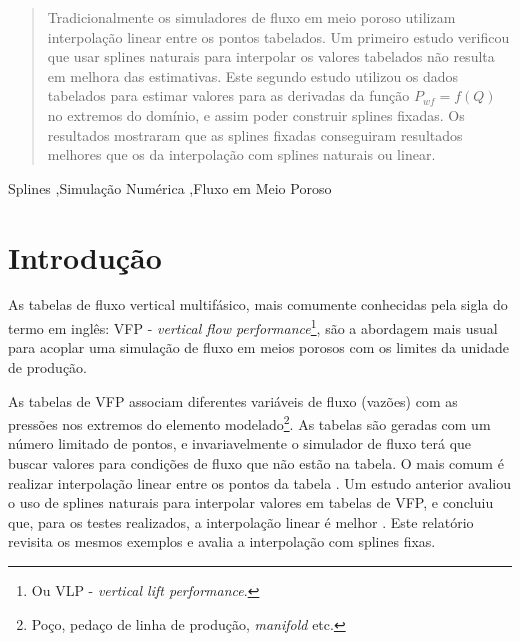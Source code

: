 \documentclass[final,5p]{elsarticle}
\numberwithin{equation}{section}
\begin{document}
\begin{frontmatter}
\begin{abstract}
    Tradicionalmente os simuladores de fluxo em meio poroso utilizam interpolação linear entre os pontos tabelados. Um primeiro estudo verificou que usar splines naturais para interpolar os valores tabelados não resulta em melhora das estimativas. Este segundo estudo utilizou os dados tabelados para estimar valores para as derivadas da função $P_{wf}=f(Q)$ no extremos do domínio, e assim poder construir splines fixadas. Os resultados mostraram que as splines fixadas conseguiram resultados melhores que os da interpolação com splines naturais ou linear.
    
\end{abstract}




\begin{keyword}
    Splines \sep Simulação Numérica \sep Fluxo em Meio Poroso



\end{keyword}

\end{frontmatter}


\section{Introdução}

    As tabelas de fluxo vertical multifásico, mais comumente conhecidas pela sigla do termo em inglês: VFP - \emph{vertical flow performance}\footnote{Ou VLP - \emph{vertical lift performance}.}, são a abordagem mais usual para acoplar uma simulação de fluxo em meios porosos com os limites da unidade de produção.

    As tabelas de VFP associam diferentes variáveis de fluxo (vazões) com as pressões nos extremos do elemento modelado\footnote{Poço, pedaço de linha de produção, \emph{manifold} etc.}. As tabelas são geradas com um número limitado de pontos, e invariavelmente o simulador de fluxo terá que buscar valores para condições de fluxo que não estão na tabela. O mais comum é realizar interpolação linear entre os pontos da tabela \cite{computer2022cmg}\cite{schlumberger2009technical}. Um estudo anterior avaliou o uso de splines naturais para interpolar valores em tabelas de VFP, e concluiu que, para os testes realizados, a interpolação linear é melhor \cite{relatoriosplinesnaturais}. Este relatório revisita os mesmos exemplos e avalia a interpolação com splines fixas.
\end{document}
